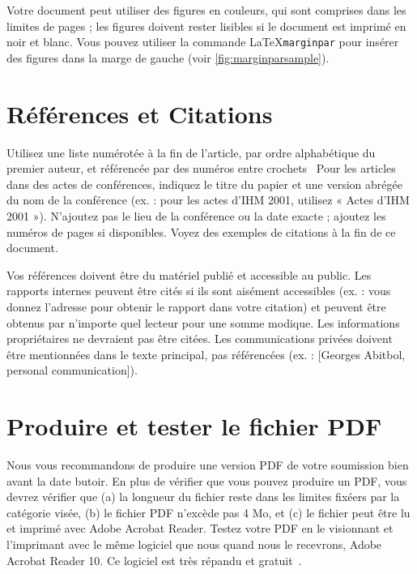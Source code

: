 \documentclass{chi-ext}
\begin{document}
Votre document peut utiliser des figures en couleurs, qui sont comprises dans les limites de pages ; les figures doivent rester lisibles si le document est imprimé en noir et blanc.
Vous pouvez utiliser la commande \LaTeX \texttt{marginpar} pour insérer des figures dans la marge de gauche (voir \autoref{fig:marginparsample}).


\section{Références et Citations}
Utilisez une liste numérotée à la fin de l'article, par ordre alphabétique du premier auteur, et référencée par des numéros entre crochets~\cite{mbl-ihm-97,coutaz-ihm-97,guiard-jmb-87}
Pour les articles dans des actes de conférences, indiquez le titre du papier et une version abrégée du nom de la conférence (ex. : pour les actes d'IHM 2001, utilisez « Actes d'IHM 2001 »).
N'ajoutez pas le lieu de la conférence ou la date exacte ; ajoutez les numéros de pages si disponibles.
Voyez des exemples de citations à la fin de ce document.

Vos références doivent être du matériel publié et accessible au public.
Les rapports internes peuvent être cités si ils sont aisément accessibles (ex. : vous donnez l'adresse pour obtenir le rapport dans votre citation) et peuvent être obtenus par n'importe quel lecteur pour une somme modique.
Les informations propriétaires ne devraient pas être citées.
Les communications privées doivent être mentionnées dans le texte principal, pas référencées (ex. : [Georges Abitbol, personal communication]).

\section{Produire et tester le fichier PDF}
Nous vous recommandons de produire une version PDF de votre soumission bien avant la date butoir.
En plus de vérifier que vous pouvez produire un PDF, vous devrez vérifier que (a) la longueur du fichier reste dans les limites fixéers par la catégorie visée, (b) le fichier PDF n'excède pas 4 Mo, et (c) le fichier peut être lu et imprimé avec Adobe Acrobat Reader.
Testez votre PDF en le visionnant et l'imprimant avec le même logiciel que nous quand nous le recevrons, Adobe Acrobat Reader 10.
Ce logiciel est très répandu et gratuit~\cite{Acrobat10}.  
\end{document}
